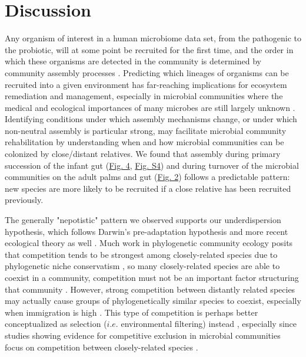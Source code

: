 \documentclass{article}
\begin{document}
\section{Discussion}
Any organism of interest in a human microbiome data set, from the pathogenic to the probiotic, will at some point be recruited for the first time, and the order in which these organisms are detected in the community is determined by community assembly processes \cite{Nemergut2013}. Predicting which lineages of organisms can be recruited into a given environment has far-reaching implications for ecosystem remediation and management, especially in microbial communities where the medical and ecological importances of many microbes are still largely unknown \cite{Martiny2015,Vazquez-Baeza2018}. Identifying conditions under which assembly mechanisms change, or under which non-neutral assembly is particular strong, may facilitate microbial community rehabilitation by understanding when and how microbial communities can be colonized by close/distant relatives. We found that assembly during primary succession of the infant gut (\hyperref[sec:figure4]{Fig. 4}, \hyperref[sec:figureS4]{Fig. S4}) and during turnover of the microbial communities on the adult palms and gut (\hyperref[sec:figure2]{Fig. 2}) follows a predictable pattern: new species are more likely to be recruited if a close relative has been recruited previously.
\par
The generally "nepotistic" pattern we observed supports our underdispersion hypothesis, which follows Darwin's pre-adaptation hypothesis \cite{Darwin1859} and more recent ecological theory as well \cite{DAndrea2019,Mayfield2010}. Much work in phylogenetic community ecology posits that competition tends to be strongest among closely-related species due to phylogenetic niche conservatism \cite{Wiens2010}, so many closely-related species are able to coexist in a community, competition must not be an important factor structuring that community \cite{Webb2002}. However, strong competition between distantly related species may actually cause groups of phylogenetically similar species to coexist, especially when immigration is high \cite{DAndrea2019,Mayfield2010,Scheffer6230}. This type of competition is perhaps better conceptualized as selection (\(i.e.\) environmental filtering) instead \cite{Mayfield2010}, especially since studies showing evidence for competitive exclusion in microbial communities focus on competition between closely-related species \cite{Peay2012,Sprockett2018}. 
\par
\end{document}
